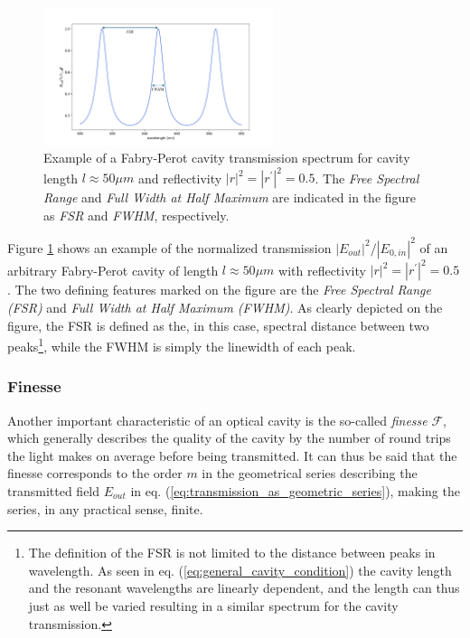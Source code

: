 \begin{figure}
    \centering
    \includegraphics[width=0.6\textwidth]{figures/fabry_perot_example.pdf}
    \caption{Example of a Fabry-Perot cavity transmission spectrum for cavity length $l \approx 50 \mu m$ and reflectivity $|r|^2 = |r^{\prime}|^2 = 0.5$. The \emph{Free Spectral Range} and \emph{Full Width at Half Maximum} are indicated in the figure as \emph{FSR} and \emph{FWHM}, respectively.}
    \label{fig:generic_fabry_perot}
\end{figure}

Figure \ref{fig:generic_fabry_perot} shows an example of the normalized transmission $|E_{out}|^2/|E_{0,in}|^2$ of an arbitrary Fabry-Perot cavity of length $l \approx 50 \mu m$ with reflectivity $|r|^2 = |r^{\prime}|^2 = 0.5$. The two defining features marked on the figure are the \emph{Free Spectral Range (FSR)} and \emph{Full Width at Half Maximum (FWHM)}. As clearly depicted on the figure, the FSR is defined as the, in this case, spectral distance between two peaks\footnote{The definition of the FSR is not limited to the distance between peaks in wavelength. As seen in eq. (\ref{eq:general_cavity_condition}) the cavity length and the resonant wavelengths are linearly dependent, and the length can thus just as well be varied resulting in a similar spectrum for the cavity transmission.}, while the FWHM is simply the linewidth of each peak. 

\subsubsection{Finesse}

Another important characteristic of an optical cavity is the so-called \emph{finesse} $\mathcal{F}$, which generally describes the quality of the cavity by the number of round trips the light makes on average before being transmitted. It can thus be said that the finesse corresponds to the order $m$ in the geometrical series describing the transmitted field $E_{out}$ in eq. (\ref{eq:transmission_as_geometric_series}), making the series, in any practical sense, finite.

